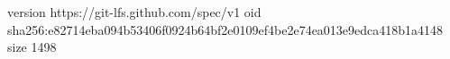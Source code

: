 version https://git-lfs.github.com/spec/v1
oid sha256:e82714eba094b53406f0924b64bf2e0109ef4be2e74ea013e9edca418b1a4148
size 1498
